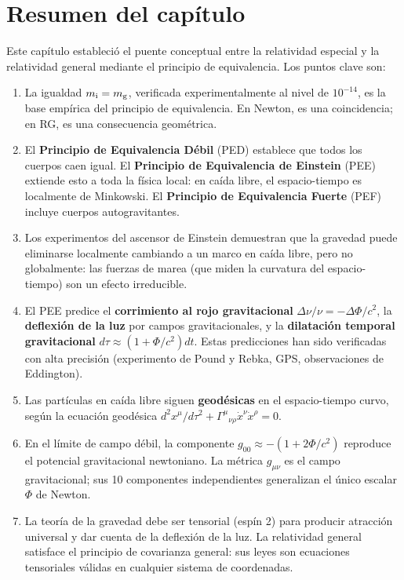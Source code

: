 \section{Resumen del capítulo}
\label{sec:resumen_cap5}

Este capítulo estableció el puente conceptual entre la relatividad especial y la relatividad general mediante el principio de equivalencia. Los puntos clave son:

\begin{enumerate}[leftmargin=2em, label=\textbf{\arabic*.}]
  \item La igualdad $m_{\rm i} = m_{\rm g}$, verificada experimentalmente al nivel de $10^{-14}$, es la base empírica del principio de equivalencia. En Newton, es una coincidencia; en RG, es una consecuencia geométrica.

  \item El \textbf{Principio de Equivalencia Débil} (PED) establece que todos los cuerpos caen igual. El \textbf{Principio de Equivalencia de Einstein} (PEE) extiende esto a toda la física local: en caída libre, el espacio-tiempo es localmente de Minkowski. El \textbf{Principio de Equivalencia Fuerte} (PEF) incluye cuerpos autogravitantes.

  \item Los experimentos del ascensor de Einstein demuestran que la gravedad puede eliminarse localmente cambiando a un marco en caída libre, pero no globalmente: las fuerzas de marea (que miden la curvatura del espacio-tiempo) son un efecto irreducible.

  \item El PEE predice el \textbf{corrimiento al rojo gravitacional} $\Delta\nu/\nu = -\Delta\Phi/c^2$, la \textbf{deflexión de la luz} por campos gravitacionales, y la \textbf{dilatación temporal gravitacional} $d\tau \approx (1 + \Phi/c^2)dt$. Estas predicciones han sido verificadas con alta precisión (experimento de Pound y Rebka, GPS, observaciones de Eddington).

  \item Las partículas en caída libre siguen \textbf{geodésicas} en el espacio-tiempo curvo, según la ecuación geodésica $d^2x^\mu/d\tau^2 + \Gamma^\mu{}_{\nu\rho}\dot{x}^\nu\dot{x}^\rho = 0$.

  \item En el límite de campo débil, la componente $g_{00} \approx -(1 + 2\Phi/c^2)$ reproduce el potencial gravitacional newtoniano. La métrica $g_{\mu\nu}$ es el campo gravitacional; sus 10 componentes independientes generalizan el único escalar $\Phi$ de Newton.

  \item La teoría de la gravedad debe ser tensorial (espín 2) para producir atracción universal y dar cuenta de la deflexión de la luz. La relatividad general satisface el principio de covarianza general: sus leyes son ecuaciones tensoriales válidas en cualquier sistema de coordenadas.
\end{enumerate}

